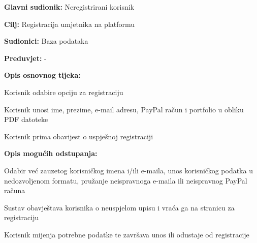 					\noindent {}
					\begin{packed_item}
						
						\item \textbf{Glavni sudionik: } Neregistrirani korisnik
						\item  \textbf{Cilj:}  Registracija umjetnika na platformu
						\item  \textbf{Sudionici:}  Baza podataka
						\item  \textbf{Preduvjet:}  -
						\item  \textbf{Opis osnovnog tijeka:}
						
						\item[] \begin{packed_enum}
							
							\item  Korisnik odabire opciju za registraciju
							\item  Korisnik unosi ime, prezime, e-mail adresu, PayPal račun i 
							portfolio u obliku PDF datoteke
							\item  Korisnik prima obavijest o uspješnoj registraciji
						\end{packed_enum}
						
						\item  \textbf{Opis mogućih odstupanja:}
						
						\item[] \begin{packed_item}
							
							\item[2.a]  Odabir već zauzetog korisničkog imena i/ili e-maila, unos korisničkog 
							podatka u nedozvoljenom formatu, pružanje neispravnoga e-maila ili neispravnog PayPal računa
							\item[] \begin{packed_enum}
								
								\item  Sustav obavještava korisnika o neuspjelom upisu i 
								vraća ga na stranicu za registraciju
								\item  Korisnik mijenja potrebne podatke te završava unos ili 
								odustaje od registracije
								
							\end{packed_enum}
							
						\end{packed_item}
					\end{packed_item}
						
